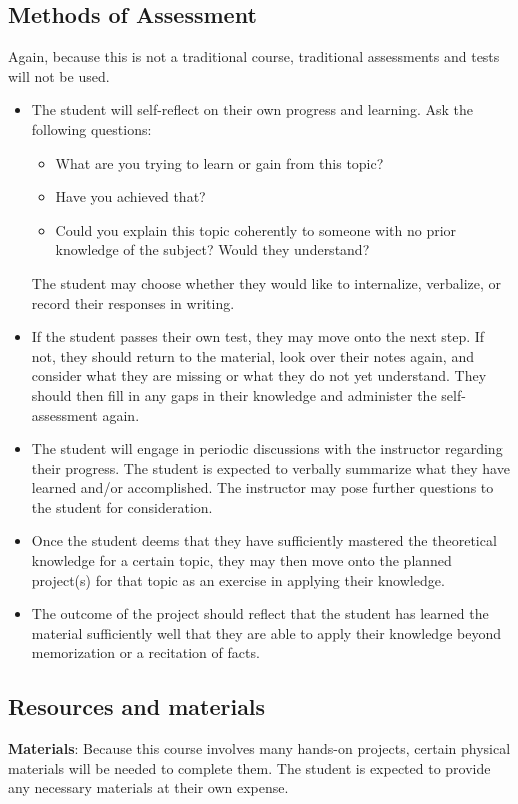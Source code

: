 \documentclass[12pt]{article}
\begin{document}
	\subsection{Methods of Assessment}
		Again, because this is not a traditional course, traditional assessments and tests will not be used. 
			\begin{itemize}
				\item The student will self-reflect on their own progress and learning. Ask the following questions:
				\begin{itemize}
					\item What are you trying to learn or gain from this topic?
					\item Have you achieved that?
					\item Could you explain this topic coherently to someone with no prior knowledge of the subject? Would they understand?
				\end{itemize}
				The student may choose whether they would like to internalize, verbalize, or record their responses in writing. 
				\item If the student passes their own test, they may move onto the next step. If not, they should return to the material, look over their notes again, and consider what they are missing or what they do not yet understand. They should then fill in any gaps in their knowledge and administer the self-assessment again. 
				\item The student will engage in periodic discussions with the instructor regarding their progress. The student is expected to verbally summarize what they have learned and/or accomplished. The instructor may pose further questions to the student for consideration. 
				\item Once the student deems that they have sufficiently mastered the theoretical knowledge for a certain topic, they may then move onto the planned project(s) for that topic as an exercise in applying their knowledge. 
				\item The outcome of the project should reflect that the student has learned the material sufficiently well that they are able to apply their knowledge beyond memorization or a recitation of facts. 
			\end{itemize}
	\subsection{Resources and materials}
		\textbf{Materials}: Because this course involves many hands-on projects, certain physical materials will be needed to complete them. The student is expected to provide any necessary materials at their own expense. 
\end{document}
